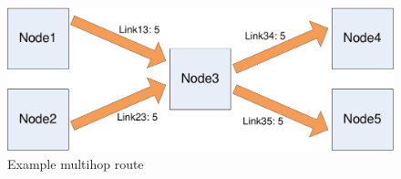 \documentclass[a4paper,twoside]{report} %
\begin{document}



\begin{figure}[t]
 \includegraphics[width=\columnwidth]{many-to-many.pdf}
 \caption{Example multihop route}\label{fig:many-to-many}
\end{figure}


\end{document}
